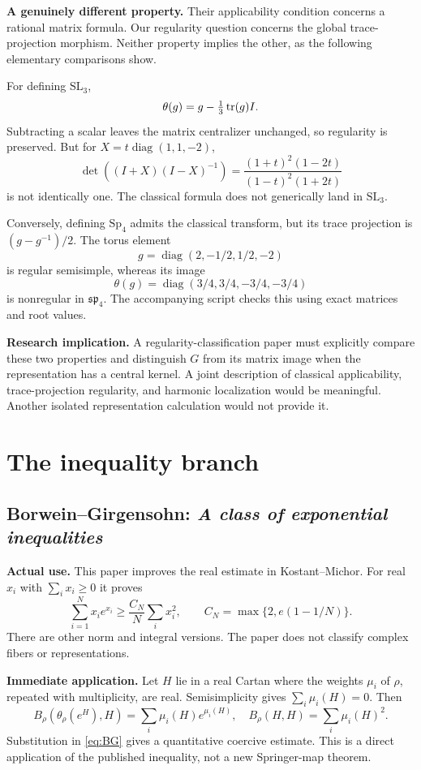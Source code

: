 \textbf{A genuinely different property.} Their applicability condition concerns a rational matrix formula. Our regularity question concerns the global trace-projection morphism. Neither property implies the other, as the following elementary comparisons show.

For defining $\mathrm{SL}_3$,
\[
\theta(g)=g-\tfrac13\operatorname{tr}(g)I.
\]
Subtracting a scalar leaves the matrix centralizer unchanged, so regularity is preserved. But for $X=t\operatorname{diag}(1,1,-2)$,
\[
\det((I+X)(I-X)^{-1})=
\frac{(1+t)^2(1-2t)}{(1-t)^2(1+2t)}
\]
is not identically one. The classical formula does not generically land in $\mathrm{SL}_3$.

Conversely, defining $\mathrm{Sp}_4$ admits the classical transform, but its trace projection is $(g-g^{-1})/2$. The torus element
\[
g=\operatorname{diag}(2,-1/2,1/2,-2)
\]
is regular semisimple, whereas its image
\[
\theta(g)=\operatorname{diag}(3/4,3/4,-3/4,-3/4)
\]
is nonregular in $\mathfrak{sp}_4$. The accompanying script checks this using exact matrices and root values.

\textbf{Research implication.} A regularity-classification paper must explicitly compare these two properties and distinguish $G$ from its matrix image when the representation has a central kernel. A joint description of classical applicability, trace-projection regularity, and harmonic localization would be meaningful. Another isolated representation calculation would not provide it.

\section{The inequality branch}
\subsection{Borwein--Girgensohn: \emph{A class of exponential inequalities}}

\textbf{Actual use.} This paper improves the real estimate in Kostant--Michor. For real $x_i$ with $\sum_i x_i\ge0$ it proves
\begin{equation}\label{eq:BG}
\sum_{i=1}^N x_i e^{x_i}\ge\frac{C_N}{N}\sum_i x_i^2,
\qquad C_N=\max\{2,e(1-1/N)\}.
\end{equation}
There are other norm and integral versions. The paper does not classify complex fibers or representations.

\textbf{Immediate application.} Let $H$ lie in a real Cartan where the weights $\mu_i$ of $\rho$, repeated with multiplicity, are real. Semisimplicity gives $\sum_i\mu_i(H)=0$. Then
\[
B_\rho(\theta_\rho(e^H),H)=\sum_i\mu_i(H)e^{\mu_i(H)},\quad
B_\rho(H,H)=\sum_i\mu_i(H)^2.
\]
Substitution in \eqref{eq:BG} gives a quantitative coercive estimate. This is a direct application of the published inequality, not a new Springer-map theorem.

